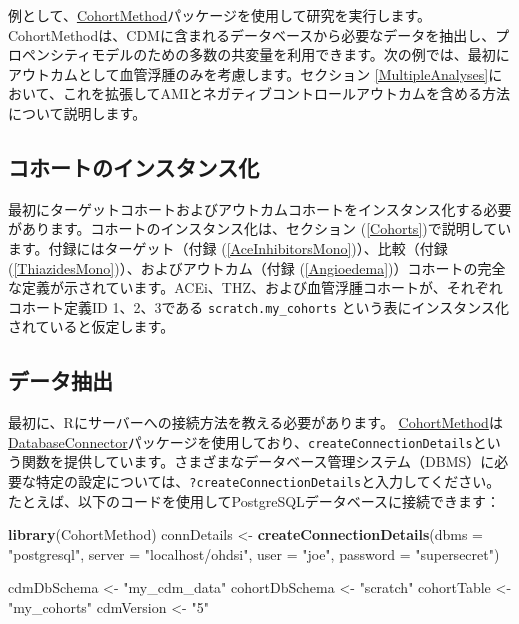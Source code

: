 \documentclass[
  11pt]{book}
\newenvironment{Shaded}{\begin{snugshade}}{\end{snugshade}}
\newcommand{\AttributeTok}[1]{\textcolor[rgb]{0.13,0.29,0.53}{#1}}
\newcommand{\FunctionTok}[1]{\textcolor[rgb]{0.13,0.29,0.53}{\textbf{#1}}}
\newcommand{\NormalTok}[1]{#1}
\newcommand{\OtherTok}[1]{\textcolor[rgb]{0.56,0.35,0.01}{#1}}
\newcommand{\StringTok}[1]{\textcolor[rgb]{0.31,0.60,0.02}{#1}}
\theoremstyle{definition}
\theoremstyle{definition}
\theoremstyle{definition}
\theoremstyle{definition}
\theoremstyle{remark}
\begin{document}
例として、\href{https://ohdsi.github.io/CohortMethod/}{CohortMethod}パッケージを使用して研究を実行します。CohortMethodは、CDMに含まれるデータベースから必要なデータを抽出し、プロペンシティモデルのための多数の共変量を利用できます。次の例では、最初にアウトカムとして血管浮腫のみを考慮します。セクション \ref{MultipleAnalyses}において、これを拡張してAMIとネガティブコントロールアウトカムを含める方法について説明します。

\subsection{コホートのインスタンス化}\label{ux30b3ux30dbux30fcux30c8ux306eux30a4ux30f3ux30b9ux30bfux30f3ux30b9ux5316-1}

最初にターゲットコホートおよびアウトカムコホートをインスタンス化する必要があります。コホートのインスタンス化は、セクション (\ref{Cohorts})で説明しています。付録にはターゲット（付録 (\ref{AceInhibitorsMono})）、比較（付録 (\ref{ThiazidesMono})）、およびアウトカム（付録 (\ref{Angioedema})）コホートの完全な定義が示されています。ACEi、THZ、および血管浮腫コホートが、それぞれコホート定義ID 1、2、3である \texttt{scratch.my\_cohorts} という表にインスタンス化されていると仮定します。

\subsection{データ抽出}\label{ux30c7ux30fcux30bfux62bdux51fa-1}

最初に、Rにサーバーへの接続方法を教える必要があります。 \href{https://ohdsi.github.io/CohortMethod/}{CohortMethod}は\href{https://ohdsi.github.io/DatabaseConnector/}{DatabaseConnector}パッケージを使用しており、\texttt{createConnectionDetails}という関数を提供しています。さまざまなデータベース管理システム（DBMS）に必要な特定の設定については、\texttt{?createConnectionDetails}と入力してください。たとえば、以下のコードを使用してPostgreSQLデータベースに接続できます：

\begin{Shaded}
\begin{Highlighting}[]
\FunctionTok{library}\NormalTok{(CohortMethod)}
\NormalTok{connDetails }\OtherTok{\textless{}{-}} \FunctionTok{createConnectionDetails}\NormalTok{(}\AttributeTok{dbms =} \StringTok{"postgresql"}\NormalTok{,}
                                       \AttributeTok{server =} \StringTok{"localhost/ohdsi"}\NormalTok{,}
                                       \AttributeTok{user =} \StringTok{"joe"}\NormalTok{,}
                                       \AttributeTok{password =} \StringTok{"supersecret"}\NormalTok{)}

\NormalTok{cdmDbSchema }\OtherTok{\textless{}{-}} \StringTok{"my\_cdm\_data"}
\NormalTok{cohortDbSchema }\OtherTok{\textless{}{-}} \StringTok{"scratch"}
\NormalTok{cohortTable }\OtherTok{\textless{}{-}} \StringTok{"my\_cohorts"}
\NormalTok{cdmVersion }\OtherTok{\textless{}{-}} \StringTok{"5"}
\end{Highlighting}
\end{Shaded}
\end{document}
